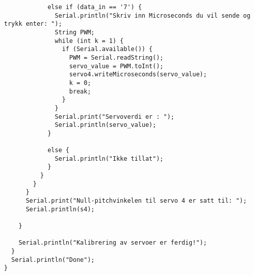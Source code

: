 \begin{lstlisting}
            else if (data_in == '7') {
              Serial.println("Skriv inn Microseconds du vil sende og trykk enter: ");
              String PWM;
              while (int k = 1) {
                if (Serial.available()) {
                  PWM = Serial.readString();
                  servo_value = PWM.toInt();
                  servo4.writeMicroseconds(servo_value);
                  k = 0;
                  break;
                }
              }
              Serial.print("Servoverdi er : ");
              Serial.println(servo_value);
            }
 
            else {
              Serial.println("Ikke tillat");
            }
          }
        }
      }
      Serial.print("Null-pitchvinkelen til servo 4 er satt til: ");
      Serial.println(s4);
 
    }
 
    Serial.println("Kalibrering av servoer er ferdig!");
  }
  Serial.println("Done");
}
\end{lstlisting}